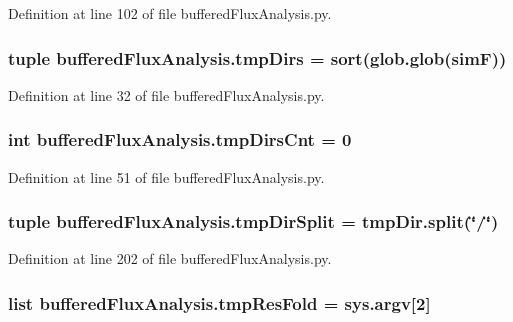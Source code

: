 Definition at line 102 of file buffered\-Flux\-Analysis.\-py.

\hypertarget{namespacebuffered_flux_analysis_afaa1b171179d99fee6ead2ae14dc8fc6}{
\subsubsection[{tmp\-Dirs}]{\setlength{\rightskip}{0pt plus 5cm}tuple buffered\-Flux\-Analysis.\-tmp\-Dirs = sort(glob.\-glob({\bf sim\-F}))}}\label{namespacebuffered_flux_analysis_afaa1b171179d99fee6ead2ae14dc8fc6}


Definition at line 32 of file buffered\-Flux\-Analysis.\-py.

\hypertarget{namespacebuffered_flux_analysis_ab845ee953d29af3dfb8e8e1c0739b760}{
\subsubsection[{tmp\-Dirs\-Cnt}]{\setlength{\rightskip}{0pt plus 5cm}int buffered\-Flux\-Analysis.\-tmp\-Dirs\-Cnt = 0}}\label{namespacebuffered_flux_analysis_ab845ee953d29af3dfb8e8e1c0739b760}


Definition at line 51 of file buffered\-Flux\-Analysis.\-py.

\hypertarget{namespacebuffered_flux_analysis_ab710247ed928de0924b2123e6aec97c9}{
\subsubsection[{tmp\-Dir\-Split}]{\setlength{\rightskip}{0pt plus 5cm}tuple buffered\-Flux\-Analysis.\-tmp\-Dir\-Split = {\bf tmp\-Dir.\-split}(\char`\"{}/\char`\"{})}}\label{namespacebuffered_flux_analysis_ab710247ed928de0924b2123e6aec97c9}


Definition at line 202 of file buffered\-Flux\-Analysis.\-py.

\hypertarget{namespacebuffered_flux_analysis_a3293821a23ed904d4f68dffd94c609e1}{
\subsubsection[{tmp\-Res\-Fold}]{\setlength{\rightskip}{0pt plus 5cm}list buffered\-Flux\-Analysis.\-tmp\-Res\-Fold = sys.\-argv\mbox{[}2\mbox{]}}}\label{namespacebuffered_flux_analysis_a3293821a23ed904d4f68dffd94c609e1}


